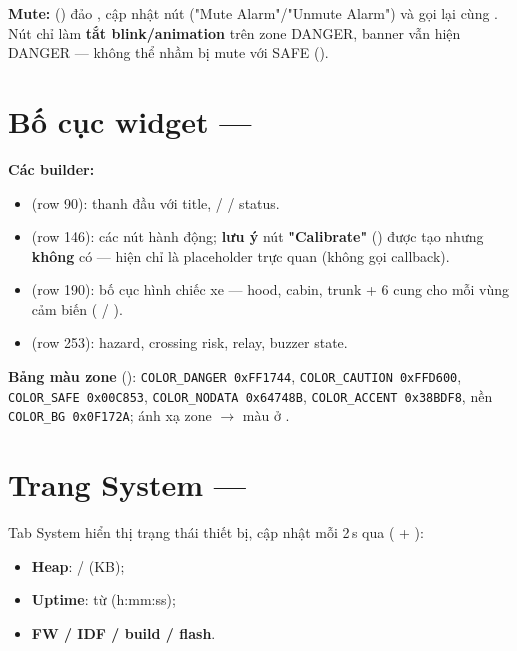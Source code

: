 \noindent\textbf{Mute:}  () đảo
, cập nhật nút ("Mute Alarm"/"Unmute Alarm") và gọi lại
 cùng .  Nút chỉ làm \textbf{tắt
blink/animation} trên zone DANGER, banner vẫn hiện DANGER — không thể nhầm bị
mute với SAFE ().

\section{Bố cục widget — }
\label{sec:layout}

\textbf{Các builder:}
\begin{itemize}
\item {} (row 90): thanh đầu với title,  /
   /  status.
\item {} (row 146): các nút hành động; \textbf{lưu ý}
  nút \textbf{"Calibrate"} () được tạo
  nhưng \textbf{không} có  — hiện chỉ là
  placeholder trực quan (không gọi callback).
\item {} (row 190): bố cục hình chiếc xe — hood,
  cabin, trunk + 6 cung  cho mỗi vùng cảm biến
  ( / ).
\item {} (row 253):  hazard, crossing
  risk, relay, buzzer state.
\end{itemize}

\noindent\textbf{Bảng màu zone} ():
\texttt{COLOR\_DANGER 0xFF1744}, \texttt{COLOR\_CAUTION 0xFFD600},
\texttt{COLOR\_SAFE 0x00C853}, \texttt{COLOR\_NODATA 0x64748B},
\texttt{COLOR\_ACCENT 0x38BDF8}, nền \texttt{COLOR\_BG 0x0F172A};
ánh xạ zone $\rightarrow$ màu ở .

\section{Trang System — }
\label{sec:system}

Tab System hiển thị trạng thái thiết bị, cập nhật mỗi 2\,s qua
 ( + ):
\begin{itemize}
\item \textbf{Heap}:  /
   (KB);
\item \textbf{Uptime}:  từ 
  (h:mm:ss);
\item \textbf{FW / IDF / build / flash}.
\end{itemize}

